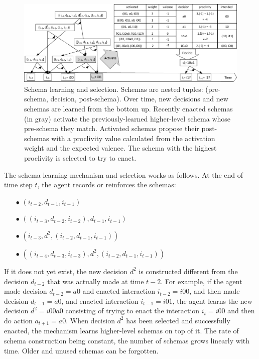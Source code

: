 \documentclass[runningheads]{llncs}
\begin{document}
\begin{figure}
	\centering
	\includegraphics[width=1.0\textwidth]{Figure_3_agent8.pdf}
	\caption{Schema learning and selection.
		Schemas are nested tuples: (pre-schema, decision, post-schema).
		Over time, new decisions and new schemas are learned from the bottom up. 
		Recently enacted schemas (in gray) activate the previously-learned higher-level schema whose pre-schema they match.
		Activated schemas propose their post-schemas with a proclivity value calculated from the activation weight and the expected valence.
		The schema with the highest proclivity is selected to try to enact.} 
	\label{fig:agent8}
\end{figure}


The schema learning mechanism and selection works as follows.
At the end of time step $t$, the agent records or reinforces the schemas: 
\begin{itemize}
	\item[$\bullet$] $(i_{t-2}, d_{t-1}, i_{t-1})$
	\item[$\bullet$] $((i_{t-3}, d_{t-2}, i_{t-2}), d_{t-1}, i_{t-1})$
	\item[$\bullet$] $(i_{t-3}, d^2, (i_{t-2}, d_{t-1}, i_{t-1}))$
	\item[$\bullet$] $((i_{t-4}, d_{t-3}, i_{t-3}), d^2, (i_{t-2}, d_{t-1}, i_{t-1}))$
\end{itemize}

If it does not yet exist, the new decision $d^2$ is constructed different from the decision $d_{t-2}$ that was actually made at time $t-2$. 
For example, if the agent made decision $d_{t-2} = a0$ and enacted interaction $i_{t-2}=i00$, and then made decision $d_{t-1} = a0$, and enacted interaction $i_{t-1}=i01$, the agent learns the new decision $d^2=i00a0$ consisting of trying to enact the interaction $i_t=i00$ and then do action $a_{t+1}=a0$. 
When decision $d^2$ has been selected and successfully enacted, the mechanism learns higher-level schemas on top of it. 
The rate of schema construction being constant, the number of schemas grows linearly with time. 
Older and unused schemas can be forgotten.
\end{document}
